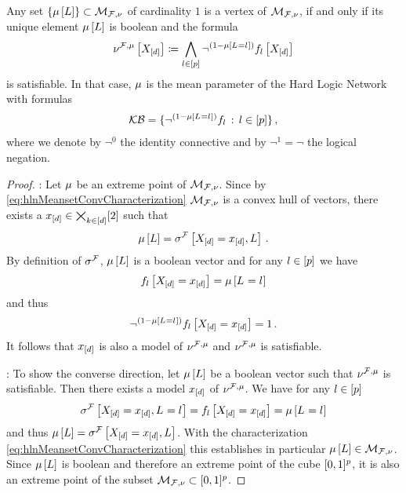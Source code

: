 \begin{theorem}\label{the:extremeCharacterizationHLN}
	Any set $\{\mu\left[L\right]\}\subset\mathcal{M}_{\mathcal{F},\nu}$ of cardinality $1$ is a vertex of $\mathcal{M}_{\mathcal{F},\nu}$, if and only if its unique element $\mu\left[L\right]$ is boolean and the formula
	\begin{align*}
		 \nu^{\mathcal{F},\mu}\left[X_{[d]}\right]
			\coloneqq \bigwedge_{l\in[p]} \lnot^{(1-\mu\left[L_{}=l_{}\right])} f_{l}\left[X_{[d]}\right]
	\end{align*}
	is satisfiable.
	In that case, $\mu$ is the mean parameter of the Hard Logic Network with formulas
	\begin{align*}
		\kb=\{\lnot^{(1-\meanparamat{\indexedselvariable})} \enumformula \, : \, \selindexin \} \, , %
	\end{align*}
	where we denote by $\lnot^0$ the identity connective and by $\lnot^1=\lnot$ the logical negation.
\end{theorem}
\begin{proof}
	\proofrightsymbol: Let $\mu$ be an extreme point of $\mathcal{M}_{\mathcal{F},\nu}$.
		Since by \eqref{eq:hlnMeansetConvCharacterization} $\mathcal{M}_{\mathcal{F},\nu}$ is a convex hull of vectors, there exists a $x_{[d]}\in\bigtimes_{k\in[d]}[2]$ such that
			\[ \mu\left[L\right] = \sigma^{\mathcal{F}}\left[X_{[d]}=x_{[d]},L\right]  \, . \]
		By definition of $\sigma^{\mathcal{F}}$, $\mu\left[L\right]$ is a boolean vector and for any $l\in[p]$ we have
			\[ f_{l}\left[X_{[d]}=x_{[d]}\right] = \mu\left[L_{}=l_{}\right] \]
		and thus
			\[ \lnot^{(1-\mu\left[L_{}=l_{}\right])} f_{l}\left[X_{[d]}=x_{[d]}\right] = 1\, .  \]
		It follows that $x_{[d]}$ is also a model of $\nu^{\mathcal{F},\mu}$ and $\nu^{\mathcal{F},\mu}$ is satisfiable.

	\proofleftsymbol: To show the converse direction, let $\mu\left[L\right]$ be a boolean vector such that $\nu^{\mathcal{F},\mu}$ is satisfiable.
		Then there exists a model $x_{[d]}$ of $\nu^{\mathcal{F},\mu}$.
		We have for any $l\in[p]$
			\[ \sigma^{\mathcal{F}}\left[X_{[d]}=x_{[d]},L_{}=l_{}\right] =  f_{l}\left[X_{[d]}=x_{[d]}\right] = \mu\left[L_{}=l_{}\right] \]
		and thus $\mu\left[L\right]=\sigma^{\mathcal{F}}\left[X_{[d]}=x_{[d]},L\right]$.
		With the characterization \eqref{eq:hlnMeansetConvCharacterization} this establishes in particular $\mu\left[L\right]\in\mathcal{M}_{\mathcal{F},\nu}$.
		Since $\mu\left[L\right]$ is boolean and therefore an extreme point of the cube $[0,1]^{p}$, it is also an extreme point of the subset $\mathcal{M}_{\mathcal{F},\nu}\subset[0,1]^{p}$.
\end{proof}

